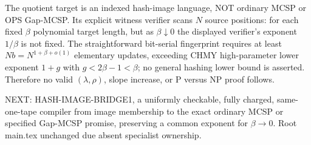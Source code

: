 \documentclass{article}
\begin{document}
The quotient target is an indexed hash-image language, NOT ordinary MCSP or OPS Gap-MCSP. Its explicit witness verifier scans $N$ source positions: for each fixed $\beta$ polynomial target length, but as $\beta\downarrow0$ the displayed verifier's exponent $1/\beta$ is not fixed. The straightforward bit-serial fingerprint requires at least $N b=N^{1+\beta+o(1)}$ elementary updates, exceeding CHMY high-parameter lower exponent $1+g$ with $g<2\beta-1<\beta$; no general hashing lower bound is asserted. Therefore no valid $(\lambda,\rho)$, slope increase, or P versus NP proof follows.

NEXT: HASH-IMAGE-BRIDGE1, a uniformly checkable, fully charged, same-one-tape compiler from image membership to the exact ordinary MCSP or specified Gap-MCSP promise, preserving a common exponent for $\beta\to0$. Root main.tex unchanged due absent specialist ownership.
\end{document}
